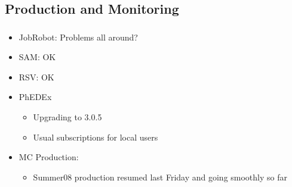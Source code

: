 \documentclass{beamer}
\begin{document}
\subsection{Production and Monitoring}
\begin{frame}
\frametitle{}
\begin{itemize}
    \item JobRobot: Problems all around?
    \item SAM: OK
    \item RSV: OK
    \item PhEDEx
    \begin{itemize}
        \item Upgrading to 3.0.5
        \item Usual subscriptions for local users
    \end{itemize}
    \item MC Production:
    \begin{itemize}
        \item Summer08 production resumed last Friday and going smoothly so far
    \end{itemize}
\end{itemize}
\end{frame}
\end{document}
